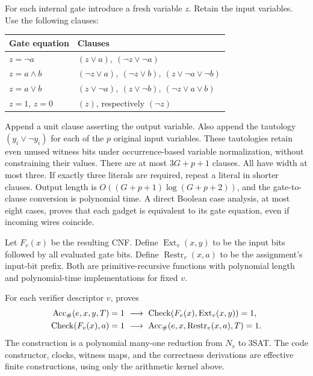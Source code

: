 For each internal gate introduce a fresh variable \(z\). Retain the input
variables. Use the following clauses:
\begin{center}
\begin{tabular}{@{}ll@{}}
\toprule
Gate equation & Clauses\\
\midrule
\(z=\neg a\) & \((z\lor a),\ (\neg z\lor\neg a)\)\\
\(z=a\land b\) & \((\neg z\lor a),\ (\neg z\lor b),\
 (z\lor\neg a\lor\neg b)\)\\
\(z=a\lor b\) & \((z\lor\neg a),\ (z\lor\neg b),\
 (\neg z\lor a\lor b)\)\\
\(z=1\), \(z=0\) & \((z)\), respectively \((\neg z)\)\\
\bottomrule
\end{tabular}
\end{center}
Append a unit clause asserting the output variable. Also append the
tautology \((y_i\lor\neg y_i)\) for each of the \(p\) original input
variables. These tautologies retain even unused witness bits under
occurrence-based variable normalization, without constraining their values.
There are at most \(3G+p+1\) clauses. All have width at most three. If exactly three literals
are required, repeat a literal in shorter clauses. Output length is
\(O((G+p+1)\log(G+p+2))\), and the gate-to-clause conversion is polynomial
time. A direct Boolean case analysis, at most eight cases, proves that each
gadget is equivalent to its gate equation, even if incoming wires coincide.

Let \(F_v(x)\) be the resulting CNF. Define
\(\operatorname{Ext}_v(x,y)\) to be the input bits followed by all evaluated
gate bits. Define \(\operatorname{Restr}_v(x,a)\) to be the assignment's
input-bit prefix. Both are primitive-recursive functions with polynomial
length and polynomial-time implementations for fixed \(v\).

\begin{theorem}
\label{thm:cook}
For each verifier descriptor \(v\), \ipra{} proves
\begin{align*}
 \operatorname{Acc}_{\#}(e,x,y,T)=1
 &\ \longrightarrow\
 \operatorname{Check}(F_v(x),\operatorname{Ext}_v(x,y))=1,\\
 \operatorname{Check}(F_v(x),a)=1
 &\ \longrightarrow\
 \operatorname{Acc}_{\#}(e,x,\operatorname{Restr}_v(x,a),T)=1.
\end{align*}
The construction is a polynomial many-one reduction from \(N_v\) to 3SAT.
The code constructor, clocks, witness maps, and the correctness derivations
are effective finite constructions, using only the arithmetic kernel above.
\end{theorem}

